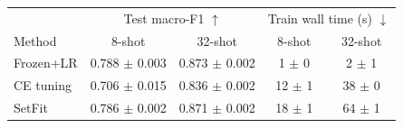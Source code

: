 \begin{tabular}{@{}lcccc@{}}
\toprule
& \multicolumn{2}{c}{Test macro-F1 $\uparrow$} & \multicolumn{2}{c}{Train wall time (s) $\downarrow$} \\
Method & 8-shot & 32-shot & 8-shot & 32-shot \\
\midrule
Frozen+LR & 0.788 $\pm$ 0.003 & 0.873 $\pm$ 0.002 & 1 $\pm$ 0 & 2 $\pm$ 1 \\
CE tuning & 0.706 $\pm$ 0.015 & 0.836 $\pm$ 0.002 & 12 $\pm$ 1 & 38 $\pm$ 0 \\
SetFit & 0.786 $\pm$ 0.002 & 0.871 $\pm$ 0.002 & 18 $\pm$ 1 & 64 $\pm$ 1 \\
\bottomrule
\end{tabular}
